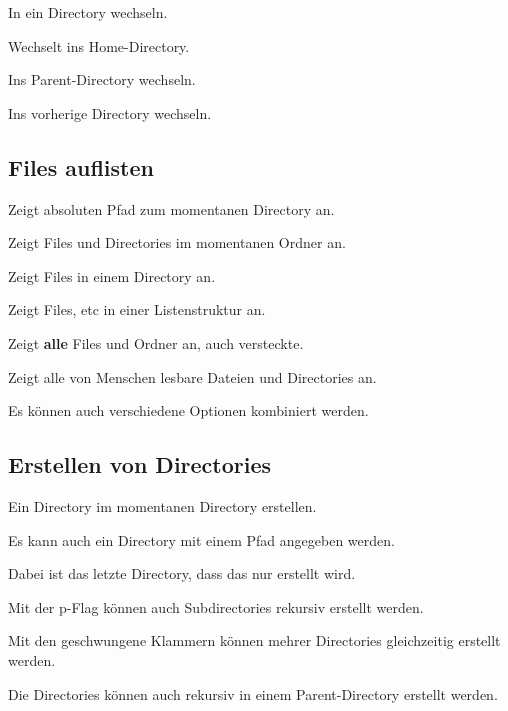 \documentclass{article}
\begin{document}
In ein Directory wechseln.

Wechselt ins Home-Directory.

Ins Parent-Directory wechseln.

Ins vorherige Directory wechseln.

\subsection{Files auflisten}
Zeigt absoluten Pfad zum momentanen Directory an.

Zeigt Files und Directories im momentanen Ordner an.

Zeigt Files in einem Directory an.

Zeigt Files, etc in einer Listenstruktur an.

Zeigt \textbf{alle} Files und Ordner an, auch versteckte.

Zeigt alle von Menschen lesbare Dateien und Directories an.

Es können auch verschiedene Optionen kombiniert werden.

\subsection{Erstellen von Directories}

Ein Directory im momentanen Directory erstellen.

Es kann auch ein Directory mit einem Pfad angegeben werden.

Dabei ist das letzte Directory, dass das nur erstellt wird.

Mit der p-Flag können auch Subdirectories rekursiv erstellt werden.

Mit den geschwungene Klammern können mehrer Directories gleichzeitig erstellt werden.

Die Directories können auch rekursiv in einem Parent-Directory erstellt werden.
\end{document}
